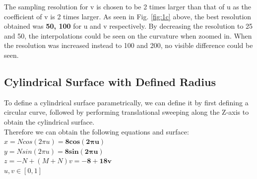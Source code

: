 \documentclass[acmlarge,nonacm=true]{acmart}
\begin{document}
The sampling resolution for v is chosen to be 2 times larger than that of u as the coefficient of v is 
2 times larger. As seen in Fig. \ref{fig:1c} above, the best resolution obtained was \textbf{50, 100} for u and v respectively.
By decreasing the resolution to 25 and 50, the interpolations could be seen on the curvature when zoomed in. 
When the resolution was increased instead to 100 and 200, no visible difference could be seen.

\subsection{Cylindrical Surface with Defined Radius}
\label{section:1d}
To define a cylindrical surface parametrically, we can define it by first 
defining a circular curve, followed by performing translational sweeping along the
Z-axis to obtain the cylindrical surface.\\
Therefore we can obtain the following equations and surface:\\
\(x = Ncos(2\pi u) = \mathbf{8cos(2\pi u)}\)\\
\(y = Nsin(2\pi u) = \mathbf{8sin(2\pi u)}\)\\
\(z = -N + (M+N)v = \mathbf{-8 + 18v}\)\\
\(u,v \in [0,1]\)
\end{document}
